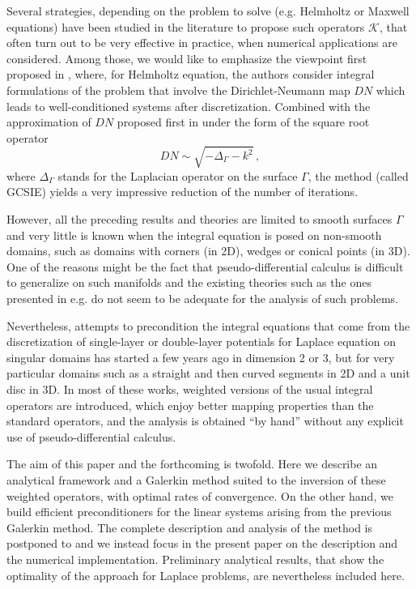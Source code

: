 \documentclass[a4paper]{subfiles}
\begin{document}
Several strategies, depending on the problem to solve (e.g. Helmholtz or Maxwell equations) have been studied in the literature to propose such 
operators $\mathcal{K}$, that often turn out to be very effective in practice, when numerical applications are considered. Among those, we would 
like to emphasize the viewpoint first proposed in \cite{alouges2005new,alouges2007stable}, where, for Helmholtz equation, the authors consider 
integral formulations of the problem that involve the Dirichlet-Neumann map $DN$ which leads to well-conditioned systems after discretization. 
Combined with the approximation of $DN$ proposed first in \cite{antoine2007generalized} under the form of the square root operator
\begin{equation}
DN \sim \sqrt{-\Delta_\Gamma -k^2}\,,
\end{equation}
where $\Delta_\Gamma$ stands for the Laplacian operator on the surface $\Gamma$, the method (called GCSIE) yields a very impressive 
reduction of the number of iterations. 

However, all the preceding results and theories are limited to smooth surfaces $\Gamma$ and very little is known when the integral equation 
is posed on non-smooth domains, such as domains with corners (in 2D), wedges or conical points (in 3D). One of the reasons might be the 
fact that pseudo-differential calculus is difficult to generalize on such manifolds and the existing theories such as the ones presented in e.g. 
\cite{melrose,schulze1,schulze2} do not seem to be adequate for the analysis of such problems.

Nevertheless, attempts to precondition the integral equations that come from the discretization of single-layer or double-layer potentials 
for Laplace equation on singular domains has started a few years ago \cite{bruno2012second,hiptmair2017closed,jerez2012explicit,
hiptmair2014mesh,ramaciotti2017some} in dimension 2 or 3, but for very particular domains such as a straight and then curved segments 
in 2D and a unit disc in 3D. In most of these works, weighted versions of the usual integral operators are introduced, which enjoy better 
mapping properties than the standard operators, and the analysis is obtained ``by hand'' without any explicit use of pseudo-differential calculus. 

The aim of this paper and the forthcoming \cite{averseng} is twofold. Here we describe an analytical framework and a Galerkin method suited to the inversion of these weighted operators, with optimal rates of convergence. On the other hand, we build efficient preconditioners for the linear systems arising from the previous Galerkin method. The complete description and analysis of the method is postponed to \cite{averseng} and we instead focus in 
the present paper on the description and the numerical implementation. Preliminary analytical results, that show the optimality of the approach
for Laplace problems, are nevertheless included here.
	
\end{document}
